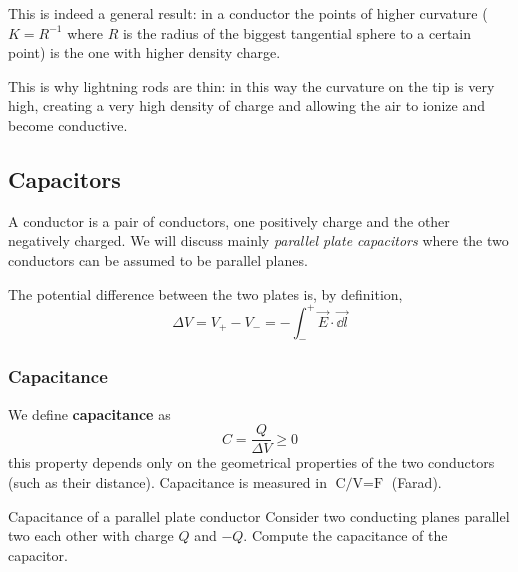 \documentclass[12pt]{extarticle}
\begin{document}
This is indeed a general result: in a conductor the points of higher curvature ($K = R^{-1}$ where $R$ is the radius of the biggest tangential sphere to a certain point) is the one with higher density charge.

This is why lightning rods are thin: in this way the curvature on the tip is very high, creating a very high density of charge and allowing the air to ionize and become conductive.

\subsection{Capacitors}

A conductor is a pair of conductors, one positively charge and the other negatively charged.
We will discuss mainly \emph{parallel plate capacitors} where the two conductors can be assumed to be parallel planes.

The potential difference between the two plates is, by definition,
\begin{equation}
	\Delta V = V_+ - V_- = - \int_-^+ \vec E \cdot \vec{\dd l}
\end{equation}

\subsubsection{Capacitance}

We define \textbf{capacitance} as
\begin{equation}
	\label{eq:capacitance}
	C = \frac{Q}{\Delta V} \geq 0
\end{equation}
this property depends only on the geometrical properties of the two conductors (such as their distance).
Capacitance is measured in $\si{\coulomb \per \volt} = \si{\farad}$ (Farad).

\begin{example}{Capacitance of a parallel plate conductor}{}
	Consider two conducting planes parallel two each other with charge $Q$ and $-Q$.
	Compute the capacitance of the capacitor.
\end{example}
\end{document}
